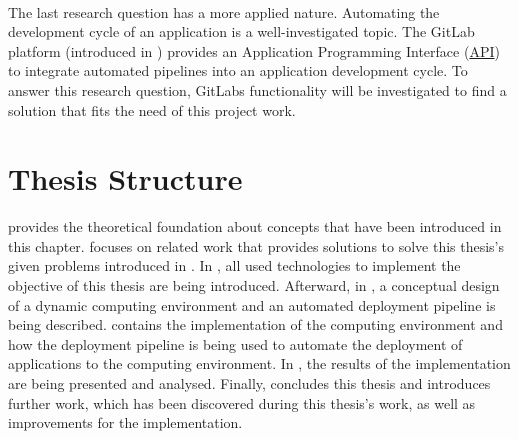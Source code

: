\paragraph{}
The last research question has a more applied nature.
Automating the development cycle of an application is a well-investigated topic.
The GitLab platform (introduced in ) provides an Application Programming Interface (\hyperlink{abbr:api}{API}) to integrate automated pipelines into an application development cycle.
To answer this research question, GitLabs functionality will be investigated to find a solution that fits the need of this project work.


\section{Thesis Structure}
 provides the theoretical foundation about concepts that have been introduced in this chapter.
 focuses on related work that provides solutions to solve this thesis's given problems introduced in .
In , all used technologies to implement the objective of this thesis are being introduced.
Afterward, in , a conceptual design of a dynamic computing environment and an automated deployment pipeline is being described.
 contains the implementation of the computing environment and how the deployment pipeline is being used to automate the deployment of applications to the computing environment.
In , the results of the implementation are being presented and analysed.
Finally,  concludes this thesis and introduces further work, which has been discovered during this thesis's work, as well as improvements for the implementation.
